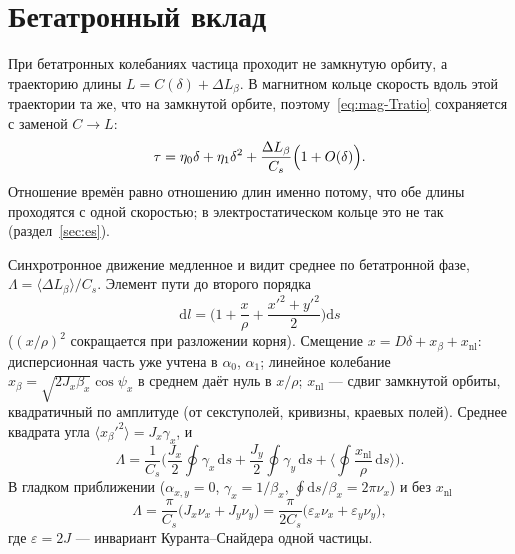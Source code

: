\section{Бетатронный вклад}
\label{sec:beta}

При бетатронных колебаниях частица проходит не замкнутую орбиту, а траекторию длины $L=C(\delta)+\Delta L_\beta$. В магнитном кольце скорость вдоль этой траектории та же, что на замкнутой орбите, поэтому~\eqref{eq:mag-Tratio} сохраняется с заменой $C\to L$:
\begin{equation}
\label{eq:beta-tau}
\tau=\eta_0\delta+\eta_1\delta^2+\frac{\Delta L_\beta}{C_s}\Bigl(1+O(\delta)\Bigr).
\end{equation}
Отношение времён равно отношению длин именно потому, что обе длины проходятся с одной скоростью; в электростатическом кольце это не так (раздел~\ref{sec:es}).

Синхротронное движение медленное и видит среднее по бетатронной фазе, $\Lambda=\langle\Delta L_\beta\rangle/C_s$. Элемент пути до второго порядка
\begin{equation}
\label{eq:beta-dl}
\mathrm{d}l=\Biggl(1+\frac{x}{\rho}+\frac{x'^2+y'^2}{2}\Biggr)\mathrm{d}s
\end{equation}
($(x/\rho)^2$ сокращается при разложении корня). Смещение $x=D\delta+x_\beta+x_{\mathrm{nl}}$: дисперсионная часть уже учтена в $\alpha_0$, $\alpha_1$; линейное колебание $x_\beta=\sqrt{2J_x\beta_x}\cos\psi_x$ в среднем даёт нуль в $x/\rho$; $x_{\mathrm{nl}}$ --- сдвиг замкнутой орбиты, квадратичный по амплитуде (от секступолей, кривизны, краевых полей). Среднее квадрата угла $\langle x_\beta'^2\rangle=J_x\gamma_x$, и
\begin{equation}
\label{eq:beta-Lambda}
\Lambda=\frac{1}{C_s}\Biggl(\frac{J_x}{2}\oint\gamma_x\,\mathrm{d}s+\frac{J_y}{2}\oint\gamma_y\,\mathrm{d}s+\Biggl\langle\oint\frac{x_{\mathrm{nl}}}{\rho}\,\mathrm{d}s\Biggr\rangle\Biggr).
\end{equation}
В гладком приближении ($\alpha_{x,y}=0$, $\gamma_x=1/\beta_x$, $\oint\mathrm{d}s/\beta_x=2\pi\nu_x$) и без $x_{\mathrm{nl}}$
\begin{equation}
\label{eq:beta-smooth}
\Lambda=\frac{\pi}{C_s}\bigl(J_x\nu_x+J_y\nu_y\bigr)=\frac{\pi}{2C_s}\bigl(\varepsilon_x\nu_x+\varepsilon_y\nu_y\bigr),
\end{equation}
где $\varepsilon=2J$ --- инвариант Куранта--Снайдера одной частицы.

